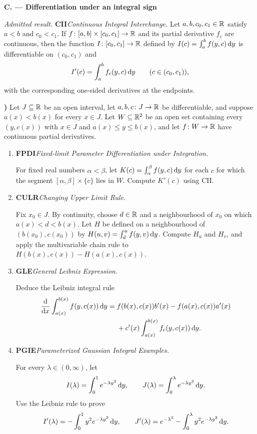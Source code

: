 \documentclass[10pt,a4paper]{article}
\newcounter{examquestion}
\newcommand{\examquestion}[1]{%
  \Needspace{5\baselineskip}%
  \refstepcounter{examquestion}%
  \par\addvspace{0.8\baselineskip}%
  \noindent\textbf{\theexamquestion)}\enspace #1\par
}
\newenvironment{subquestions}
  {\begin{enumerate}[label=\alph*),leftmargin=2.1em]}
  {\end{enumerate}}
\newcommand{\nameditem}[2]{%
  \textbf{\textsf{#1}}\enspace\emph{#2.}\enspace
}
\newcommand{\admitted}[3]{%
  \par\smallskip\noindent\emph{Admitted result.}\enspace
  \nameditem{#1}{#2}#3\par
}
\newcommand{\subpart}[1]{%
  \begin{center}
    \textbf{#1}
  \end{center}
}
\begin{document}
\subpart{C. --- Differentiation under an integral sign}

\admitted{CII}{Continuous Integral Interchange}{Let
$a,b,c_0,c_1\in\mathbb{R}$ satisfy $a<b$ and $c_0<c_1$.  If
$f\colon[a,b]\times[c_0,c_1]\to\mathbb{R}$ and its partial derivative $f_c$ are
continuous, then the function $I\colon[c_0,c_1]\to\mathbb{R}$ defined by
$I(c)=\int_a^b f(y,c)\,\mathrm{d} y$ is differentiable on $(c_0,c_1)$ and
\[
 I'(c)=\int_a^b f_c(y,c)\,\mathrm{d} y
 \qquad(c\in(c_0,c_1)),
\]
with the corresponding one-sided derivatives at the endpoints.}

\examquestion{\label{q:leibniz-integral}
Let $J\subseteq\mathbb{R}$ be an open interval, let
$a,b,c\colon J\to\mathbb{R}$ be differentiable, and suppose $a(x)<b(x)$ for every
$x\in J$.  Let $W\subseteq\mathbb{R}^2$ be an open set containing every
$(y,c(x))$ with $x\in J$ and $a(x)\leq y\leq b(x)$, and let
$f\colon W\to\mathbb{R}$ have continuous partial derivatives.
\begin{subquestions}
  \item \nameditem{FPDI}{Fixed-limit Parameter Differentiation under Integration}
  For fixed real numbers $\alpha<\beta$, let
  $K(c)=\int_\alpha^\beta f(y,c)\,\mathrm{d} y$ for each $c$ for which the segment
  $[\alpha,\beta]\times\{c\}$ lies in $W$.  Compute $K'(c)$ using CII.

  \item \nameditem{CULR}{Changing Upper Limit Rule}
  Fix $x_0\in J$.  By continuity, choose $d\in\mathbb{R}$ and a neighbourhood of
  $x_0$ on which $a(x)<d<b(x)$.  Let $H$ be defined on a neighbourhood of
  $(b(x_0),c(x_0))$ by $H(u,v)=\int_d^u f(y,v)\,\mathrm{d} y$.  Compute $H_u$ and
  $H_v$, and apply the multivariable chain rule to
  $H(b(x),c(x))-H(a(x),c(x))$.

  \item \nameditem{GLE}{General Leibniz Expression}
  Deduce the Leibniz integral rule
  \[
  \begin{aligned}
  \frac{\mathrm{d}}{\mathrm{d} x}\int_{a(x)}^{b(x)}f(y,c(x))\,\mathrm{d} y
  ={}&f(b(x),c(x))b'(x)-f(a(x),c(x))a'(x)\\
     &+c'(x)\int_{a(x)}^{b(x)}f_c(y,c(x))\,\mathrm{d} y.
  \end{aligned}
  \]

  \item \nameditem{PGIE}{Parameterized Gaussian Integral Examples}
  For every $\lambda\in(0,\infty)$, let
  \[
    I(\lambda)=\int_0^1 e^{-\lambda y^2}\,\mathrm{d} y,
    \qquad
    J(\lambda)=\int_0^\lambda e^{-\lambda y^2}\,\mathrm{d} y.
  \]
  Use the Leibniz rule to prove
  \[
    I'(\lambda)=-\int_0^1 y^2e^{-\lambda y^2}\,\mathrm{d} y,
    \qquad
    J'(\lambda)=e^{-\lambda^3}
      -\int_0^\lambda y^2e^{-\lambda y^2}\,\mathrm{d} y.
  \]
\end{subquestions}}
\end{document}
